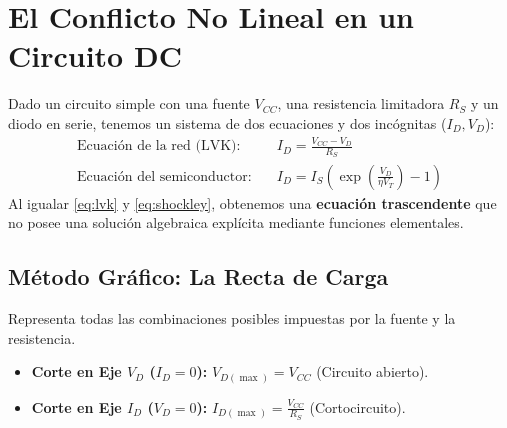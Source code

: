 \documentclass[11pt, a4paper]{article}
\begin{document}
\section{El Conflicto No Lineal en un Circuito DC}
Dado un circuito simple con una fuente $V_{CC}$, una resistencia limitadora $R_S$ y un diodo en serie, tenemos un sistema de dos ecuaciones y dos incógnitas ($I_D, V_D$):
\begin{align}
    \text{Ecuación de la red (LVK):} \quad & I_D = \frac{V_{CC} - V_D}{R_S} \label{eq:lvk} \\
    \text{Ecuación del semiconductor:} \quad & I_D = I_S \left( \exp\left(\frac{V_D}{\eta V_T}\right) - 1 \right) \label{eq:shockley}
\end{align}
Al igualar \eqref{eq:lvk} y \eqref{eq:shockley}, obtenemos una \textbf{ecuación trascendente} que no posee una solución algebraica explícita mediante funciones elementales. 

\subsection{Método Gráfico: La Recta de Carga}
Representa todas las combinaciones posibles impuestas por la fuente y la resistencia.
\begin{itemize}
    \item \textbf{Corte en Eje $V_D$ ($I_D = 0$):} $V_{D(\max)} = V_{CC}$ (Circuito abierto).
    \item \textbf{Corte en Eje $I_D$ ($V_D = 0$):} $I_{D(\max)} = \frac{V_{CC}}{R_S}$ (Cortocircuito).
\end{itemize}
\end{document}
